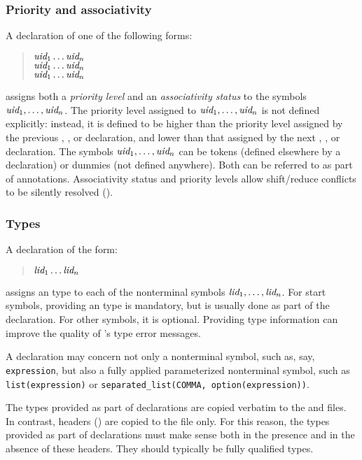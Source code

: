 \documentclass[onecolumn,11pt,nocopyrightspace,preprint]{sigplanconf}
\begin{document}
\subsubsection{Priority and associativity}
\label{sec:assoc}

A declaration of one of the following forms:
\begin{quote}
\dnonassoc $\textit{uid}_1 \ldots \textit{uid}_n$ \\
\dleft $\textit{uid}_1 \ldots \textit{uid}_n$ \\
\dright $\textit{uid}_1 \ldots \textit{uid}_n$
\end{quote}
assigns both a \emph{priority level} and an \emph{associativity status} to
the symbols $\textit{uid}_1, \ldots, \textit{uid}_n$. The priority level assigned to
$\textit{uid}_1, \ldots, \textit{uid}_n$ is not defined explicitly: instead, it is
defined to be higher than the priority level assigned by the previous
\dnonassoc, \dleft, or \dright declaration, and lower than that assigned by the next
\dnonassoc, \dleft, or \dright declaration. The symbols $\textit{uid}_1, \ldots, \textit{uid}_n$
can be tokens (defined elsewhere by a \dtoken declaration) or dummies (not
defined anywhere). Both can be referred to as part of \dprec annotations.
Associativity status and priority levels allow shift/reduce conflicts to be
silently resolved ().

\subsubsection{Types}
\label{sec:type}

A declaration of the form:
\begin{quote}
\dtype \ocamltype $\textit{lid}_1 \ldots \textit{lid}_n$
\end{quote}
assigns an \ocaml type to each of the nonterminal symbols $\textit{lid}_1, \ldots, \textit{lid}_n$.
For start symbols, providing an \ocaml type is mandatory, but is usually done as part of the
\dstart declaration. For other symbols, it is optional. Providing type information can improve
the quality of \ocaml's type error messages.

A \dtype declaration may concern not only a nonterminal symbol, such as, say,
\texttt{expression}, but also a fully applied parameterized nonterminal
symbol, such as \texttt{list(expression)} or \texttt{separated\_list(COMMA,
  option(expression))}.

The types provided as part of \dtype declarations are copied verbatim to the
\ml and \mli files. In contrast, headers () are copied
to the \ml file only. For this reason, the types provided as part of \dtype
declarations must make sense both in the presence and in the absence of these
headers. They should typically be fully qualified types.
\end{document}
